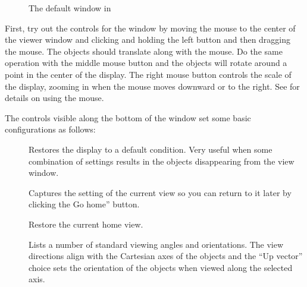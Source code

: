 \begin{figure}[htb]
  \begin{makeimage}
  \end{makeimage}
  \viewerwindow
  \caption{\label{fig:viewwindow} The default \viewer{} window in \SR{}}
\end{figure}


First, try out the controls for the \graphics{} window by moving the mouse
to the center of the viewer window and clicking and holding the left button
and then dragging the mouse.  The objects should translate along with the
mouse.  Do the same operation with the middle mouse button and the objects
will rotate around a point in the center of the display.  The right mouse
button controls the scale of the display, zooming in when the mouse moves
downward or to the right.  See  for details on using the mouse.

The controls visible along the bottom of the \viewer{} window set some basic
configurations as follows:
%
\begin{description}
\item []\mbox{}
  
  Restores the display to a default condition. Very useful when some
  combination of settings results in the objects disappearing from the
  view window.

\item []\mbox{}
  
  Captures the setting of the current view so you can return to it
  later by clicking the Go home'' button.

\item []\mbox{}

  Restore the current home view.

\item []\mbox{}
  
  Lists a number of standard viewing angles and orientations.  The
  view directions align with the Cartesian axes of the objects and the
  ``Up vector'' choice sets the orientation of the objects when viewed
  along the selected axis.

\end{description}

